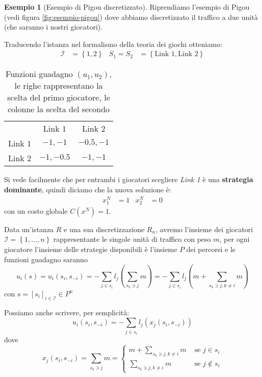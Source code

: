\documentclass[a4paper]{article}
\theoremstyle{plain}
\theoremstyle{definition}
\newtheorem{myes}[myteo]{Esempio}
\theoremstyle{remark}
\newcommand{\set}[1]{\left\{#1\right\}}
\newcommand{\pa}[1]{\left(#1\right)}
\newcommand{\bra}[1]{\left[#1\right]}
\begin{document}
\begin{myes}[Esempio di Pigou discretizzato]
\label{es:pigou-nash}
  Riprendiamo l'esempio di Pigou (vedi figura \ref{fig:esempio-pigou})
  dove abbiamo discretizzato il traffico a due unità (che saranno i
  nostri giocatori).

  Traducendo l'istanza nel formalismo della teoria dei giochi
  otteniamo:
  \begin{align*}
    \mathcal{I} &= \set{1,2} & S_1 = S_2 & = \set{\text{Link 1},
                                           \text{Link 2}}
  \end{align*}
  \begin{table}[!ht]
    \centering
    \begin{tabular}{rcc}
      & Link $1$ & Link $2$ \\
      \cline{2-3}
      Link $1$ & \multicolumn{1}{|c|}{$-1,-1$} & \multicolumn{1}{|c|}{$-0.5,-1$}  \\
      \cline{2-3}
      Link $2$ & \multicolumn{1}{|c|}{$-1,-0.5$} & \multicolumn{1}{|c|}{$-1,-1$}  \\
      \cline{2-3}
    \end{tabular}
    \caption{Funzioni guadagno $(u_1,u_2)$, le righe rappresentano la
      scelta del primo giocatore, le colonne la scelta del secondo}
    \label{tab:pigou-nash}
  \end{table}

  Si vede facilmente che per entrambi i giocatori scegliere
  \textit{Link 1} è una \textbf{strategia dominante}, quindi diciamo
  che la nuova soluzione è:
  \begin{align*}
    x^{N}_1 &= 1 & x^{N}_2 &= 0
  \end{align*}
  con un costo globale $C\pa{x^{N}} = 1$.
\end{myes}

Data un'istanza $R$ e una sua discretizzazione $R_n$, avremo
l'insieme dei giocatori $\mathcal{I} = \set{1,...,n}$ rappresentante
le singole unità di traffico con peso $m$, per ogni giocatore
l'insieme delle strategie disponibili è l'insieme $P$ dei percorsi e
le funzioni guadagno saranno
\[ u_i \pa{s} = u_i\pa{s_i, s_{-i}} = - \sum _{j\in s_i}
  l_j\pa{\sum_{s_k\ni j} m} = -\sum _{j\in s_i} l_j\pa{m + \sum_{s_k\ni
      j,k\neq i} m} \]
con $s = \bra{s_i}_{i\in\mathcal{I}} \in P^n$

Possiamo anche scrivere, per semplicità:
\[ u_i\pa{s_i, s_{-i}} = - \sum _{j\in s_i} l_j\pa{x_j\pa{s_i, s_{-i}}} \]
dove
\[ x_j\pa{s_i,s_{-i}} = \sum_{s_k\ni j} m = \left\{ 
    \begin{matrix}
      m + \sum_{s_k\ni j,k\neq i} m & \text{ se } j\in s_i \\
      \sum_{s_k\ni j,k\neq i} m & \text{ se } j\not\in s_i
    \end{matrix}
  \right.
\]
\end{document}
